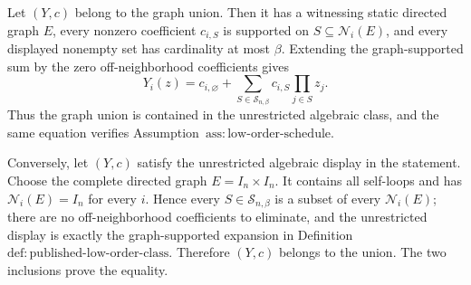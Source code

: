 Let \((Y,c)\) belong to the graph union.  Then it has a witnessing static directed graph \(E\), every nonzero coefficient \(c_{i,S}\) is supported on \(S\subseteq\mathcal N_i(E)\), and every displayed nonempty set has cardinality at most \(\beta\).  Extending the graph-supported sum by the zero off-neighborhood coefficients gives
\[
Y_i(z)=c_{i,\varnothing}+
\sum_{S\in\mathcal S_{n,\beta}}c_{i,S}\prod_{j\in S}z_j.
\]
Thus the graph union is contained in the unrestricted algebraic class, and the same equation verifies Assumption~\(\mathrm{ass{:}low\text{-}order\text{-}schedule}\).

Conversely, let \((Y,c)\) satisfy the unrestricted algebraic display in the statement.  Choose the complete directed graph \(E=I_n\times I_n\).  It contains all self-loops and has \(\mathcal N_i(E)=I_n\) for every \(i\).  Hence every \(S\in\mathcal S_{n,\beta}\) is a subset of every \(\mathcal N_i(E)\); there are no off-neighborhood coefficients to eliminate, and the unrestricted display is exactly the graph-supported expansion in Definition~\(\mathrm{def{:}published\text{-}low\text{-}order\text{-}class}\).  Therefore \((Y,c)\) belongs to the union.  The two inclusions prove the equality.